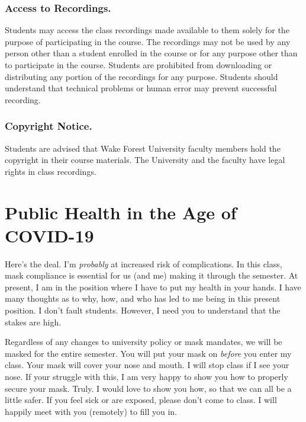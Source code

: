 \hypertarget{access-to-recordings.}{%
\subsection{Access to Recordings.}\label{access-to-recordings.}}

Students may access the class recordings made available to them solely for the purpose of participating in the course. The recordings may not be used by any person other than a student enrolled in the course or for any purpose other than to participate in the course. Students are prohibited from downloading or distributing any portion of the recordings for any purpose. Students should understand that technical problems or human error may prevent successful recording.

\hypertarget{copyright-notice.}{%
\subsection{Copyright Notice.}\label{copyright-notice.}}

Students are advised that Wake Forest University faculty members hold the copyright in their course materials. The University and the faculty have legal rights in class recordings.

\hypertarget{public-health-in-the-age-of-covid-19}{%
\chapter{Public Health in the Age of COVID-19}\label{public-health-in-the-age-of-covid-19}}

Here's the deal. I'm \emph{probably} at increased risk of complications. In this class, mask compliance is essential for us (and me) making it through the semester. At present, I am in the position where I have to put my health in your hands. I have many thoughts as to why, how, and who has led to me being in this present position. I don't fault students. However, I need you to understand that the stakes are high.

Regardless of any changes to university policy or mask mandates, we will be masked for the entire semester. You will put your mask on \emph{before} you enter my class. Your mask will cover your nose and mouth. I will stop class if I see your nose. If your struggle with this, I am very happy to show you how to properly secure your mask. Truly. I would love to show you how, so that we can all be a little safer. If you feel sick or are exposed, please don't come to class. I will happily meet with you (remotely) to fill you in.

